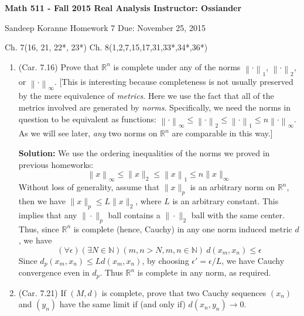 \documentclass{article}
\def\le{\leqslant}
\def\to{\rightarrow}
\newcommand{\norm}[1]{\left\lVert#1\right\rVert}
\def\NN{\mathbb N}
\def\RR{\mathbb R}
\begin{document}
\thispagestyle{empty}

\textbf{Math 511 - Fall 2015 \hfill Real Analysis  \hfill Instructor: Ossiander}

\hrulefill 
\medskip 

 {Sandeep Koranne \hfill  Homework 7 \hfill Due: November 25, 2015}
 \begin{center}
Ch. 7(16, 21, 22*, 23*) Ch. 8(1,2,7,15,17,31,33*,34*,36*)
 \end{center}
\medskip

\begin{enumerate}


\item (Car. 7.16) Prove that $\RR^n$ is complete under any of the norms $\norm{\cdot}_1$, $\norm{\cdot}_2$, or $\norm{\cdot}_{\infty}$. [This is interesting because completeness is not usually preserved by the mere equivalence of \textit{metrics}. Here we use the fact that all of the metrics involved are generated by \textit{norms}. Specifically, we need the norms in question to be equivalent as functions: $\norm{\cdot}_{\infty} \le \norm{\cdot}_2 \le \norm{\cdot}_1 \le n \norm{\cdot}_{\infty}$. As we will see later, \textit{any} two norms on $\RR^n$ are comparable in this way.]

\textbf{Solution:} We use the ordering inequalities of the norms
we proved in previous homeworks:
\[
\norm{x}_\infty \le \|x\|_2 \le \norm{x}_1 \le n \|x\|_\infty
\]
Without loss of generality, assume that $\|x\|_p$ is an arbitrary 
norm on $\RR^n$,
then we have $\|x\|_p \le L \|x\|_2$, where $L$ is an arbitrary constant.
This implies that any $\|\cdot\|_p$ ball contains a $\|\cdot\|_2$ ball with
the same center. Thus, since $\RR^n$ is complete (hence, Cauchy) in any one
norm induced metric $d$, we have
\[
(\forall \epsilon)(\exists N \in \NN)(m,n > N, m,n \in \NN)\ d(x_m,x_n) \le \epsilon
\]
Since $d_p(x_m,x_n) \le L d(x_m,x_n)$, by choosing $\epsilon'=\epsilon/L$, we
have Cauchy convergence even in $d_p$. Thus $\RR^n$ is complete in any norm, as
required.


\item (Car. 7.21) If $(M, d)$ is complete, prove that two Cauchy sequences $(x_n)$ and $(y_n)$ have the same limit if (and only if) $d(x_n, y_n) \to 0$.


\end{enumerate}
\end{document}
